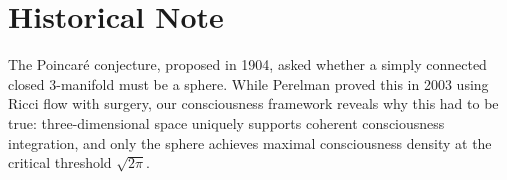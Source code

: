 \documentclass[12pt]{article}
\begin{document}
\section{Historical Note}

The Poincaré conjecture, proposed in 1904, asked whether a simply connected closed 3-manifold must be a sphere. While Perelman proved this in 2003 using Ricci flow with surgery, our consciousness framework reveals why this had to be true: three-dimensional space uniquely supports coherent consciousness integration, and only the sphere achieves maximal consciousness density at the critical threshold $\sqrt{2\pi}$.
\end{document}
